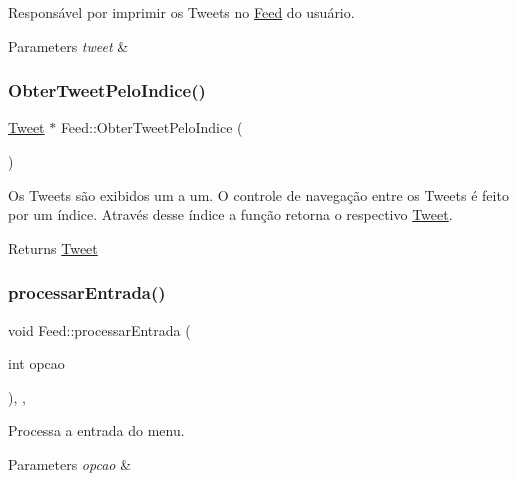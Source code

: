 Responsável por imprimir os Tweets no \hyperlink{class_feed}{Feed} do usuário. 


\begin{DoxyParams}{Parameters}
{\em tweet} & \\
\hline
\end{DoxyParams}
\mbox{\label{class_feed_a75babf2ee06b455ffee4236a41621500}} 
\subsubsection{\texorpdfstring{Obter\+Tweet\+Pelo\+Indice()}{ObterTweetPeloIndice()}}
{\footnotesize\ttfamily \hyperlink{class_tweet}{Tweet} $\ast$ Feed\+::\+Obter\+Tweet\+Pelo\+Indice (\begin{DoxyParamCaption}{ }\end{DoxyParamCaption})\hspace{0.3cm}{\ttfamily [private]}}



Os Tweets são exibidos um a um. O controle de navegação entre os Tweets é feito por um índice. Através desse índice a função retorna o respectivo \hyperlink{class_tweet}{Tweet}. 

\begin{DoxyReturn}{Returns}
\hyperlink{class_tweet}{Tweet} 
\end{DoxyReturn}
\mbox{\label{class_feed_ac10ffff3edd9e5e9b51fd713bc055dff}} 
\subsubsection{\texorpdfstring{processar\+Entrada()}{processarEntrada()}}
{\footnotesize\ttfamily void Feed\+::processar\+Entrada (\begin{DoxyParamCaption}\item[{int}]{opcao }\end{DoxyParamCaption})\hspace{0.3cm}{\ttfamily [override]}, {\ttfamily [private]}, {\ttfamily [virtual]}}



Processa a entrada do menu. 


\begin{DoxyParams}{Parameters}
{\em opcao} & \\
\hline
\end{DoxyParams}


